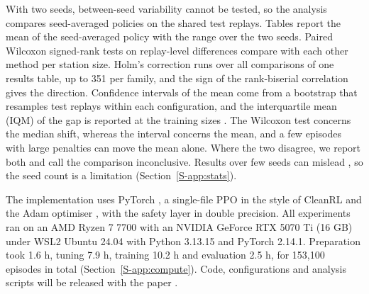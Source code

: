 With two seeds, between-seed variability cannot be tested, so the analysis compares seed-averaged policies on the shared test replays.
Tables report the mean of the seed-averaged policy with the range over the two seeds.
Paired Wilcoxon signed-rank tests \cite{wilcoxon1945individual} on replay-level differences compare \method{} with each other method per station size.
Holm's correction runs over all comparisons of one results table, up to 351 per family, and the sign of the rank-biserial correlation gives the direction.
Confidence intervals of the mean come from a bootstrap that resamples test replays within each configuration, and the interquartile mean (IQM) of the gap is reported at the training sizes \cite{agarwal2021deep}.
The Wilcoxon test concerns the median shift, whereas the interval concerns the mean, and a few episodes with large penalties can move the mean alone.
Where the two disagree, we report both and call the comparison inconclusive.
Results over few seeds can mislead \cite{henderson2018deep}, so the seed count is a limitation (Section~\ref{S-app:stats}).

The implementation uses PyTorch \cite{paszke2019pytorch}, a single-file PPO in the style of CleanRL \cite{huang2022cleanrl} and the Adam optimiser \cite{kingma2015adam}, with the safety layer in double precision.
All experiments ran on an AMD Ryzen 7 7700 with an NVIDIA GeForce RTX 5070 Ti (16 GB) under WSL2 Ubuntu 24.04 with Python 3.13.15 and PyTorch 2.14.1.
Preparation took 1.6 h, tuning 7.9 h, training 10.2 h and evaluation 2.5 h, for 153,100 episodes in total (Section~\ref{S-app:compute}).
Code, configurations and analysis scripts will be released with the paper .
